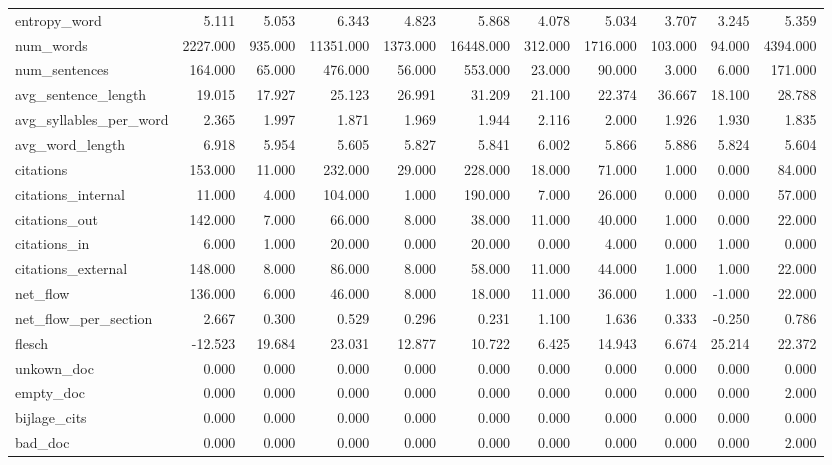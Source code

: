 \begin{tabular}{lrrrrrrrrrr}
\cline{1-11}
entropy\_word & 5.111 & 5.053 & 6.343 & 4.823 & 5.868 & 4.078 & 5.034 & 3.707 & 3.245 & 5.359 \\
\cline{1-11}
num\_words & 2227.000 & 935.000 & 11351.000 & 1373.000 & 16448.000 & 312.000 & 1716.000 & 103.000 & 94.000 & 4394.000 \\
\cline{1-11}
num\_sentences & 164.000 & 65.000 & 476.000 & 56.000 & 553.000 & 23.000 & 90.000 & 3.000 & 6.000 & 171.000 \\
\cline{1-11}
avg\_sentence\_length & 19.015 & 17.927 & 25.123 & 26.991 & 31.209 & 21.100 & 22.374 & 36.667 & 18.100 & 28.788 \\
\cline{1-11}
avg\_syllables\_per\_word & 2.365 & 1.997 & 1.871 & 1.969 & 1.944 & 2.116 & 2.000 & 1.926 & 1.930 & 1.835 \\
\cline{1-11}
avg\_word\_length & 6.918 & 5.954 & 5.605 & 5.827 & 5.841 & 6.002 & 5.866 & 5.886 & 5.824 & 5.604 \\
\cline{1-11}
citations & 153.000 & 11.000 & 232.000 & 29.000 & 228.000 & 18.000 & 71.000 & 1.000 & 0.000 & 84.000 \\
\cline{1-11}
citations\_internal & 11.000 & 4.000 & 104.000 & 1.000 & 190.000 & 7.000 & 26.000 & 0.000 & 0.000 & 57.000 \\
\cline{1-11}
citations\_out & 142.000 & 7.000 & 66.000 & 8.000 & 38.000 & 11.000 & 40.000 & 1.000 & 0.000 & 22.000 \\
\cline{1-11}
citations\_in & 6.000 & 1.000 & 20.000 & 0.000 & 20.000 & 0.000 & 4.000 & 0.000 & 1.000 & 0.000 \\
\cline{1-11}
citations\_external & 148.000 & 8.000 & 86.000 & 8.000 & 58.000 & 11.000 & 44.000 & 1.000 & 1.000 & 22.000 \\
\cline{1-11}
net\_flow & 136.000 & 6.000 & 46.000 & 8.000 & 18.000 & 11.000 & 36.000 & 1.000 & -1.000 & 22.000 \\
\cline{1-11}
net\_flow\_per\_section & 2.667 & 0.300 & 0.529 & 0.296 & 0.231 & 1.100 & 1.636 & 0.333 & -0.250 & 0.786 \\
\cline{1-11}
flesch & -12.523 & 19.684 & 23.031 & 12.877 & 10.722 & 6.425 & 14.943 & 6.674 & 25.214 & 22.372 \\
\cline{1-11}
unkown\_doc & 0.000 & 0.000 & 0.000 & 0.000 & 0.000 & 0.000 & 0.000 & 0.000 & 0.000 & 0.000 \\
\cline{1-11}
empty\_doc & 0.000 & 0.000 & 0.000 & 0.000 & 0.000 & 0.000 & 0.000 & 0.000 & 0.000 & 2.000 \\
\cline{1-11}
bijlage\_cits & 0.000 & 0.000 & 0.000 & 0.000 & 0.000 & 0.000 & 0.000 & 0.000 & 0.000 & 0.000 \\
\cline{1-11}
bad\_doc & 0.000 & 0.000 & 0.000 & 0.000 & 0.000 & 0.000 & 0.000 & 0.000 & 0.000 & 2.000 \\
\cline{1-11}
\bottomrule
\end{tabular}
